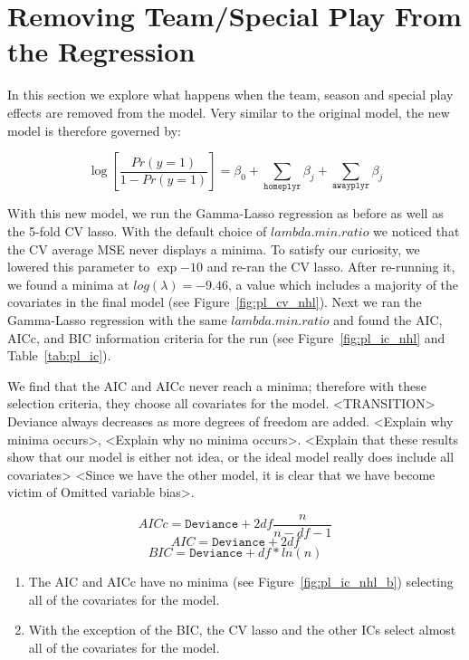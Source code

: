 \documentclass[11pt, fleqn]{article}
\begin{document}


\section{Removing Team/Special Play From the Regression}

In this section we explore what happens when the team, season and special play effects are removed from the model.  Very similar to the original model, the new model is therefore governed by:

\[ \log\left[\frac{Pr(y=1)}{1-Pr(y=1)}\right] = \beta_0 + \sum_{\texttt{homeplyr}} \beta_j + \sum_{\texttt{awayplyr}} \beta_j \]

With this new model, we run the Gamma-Lasso regression as before as well as the 5-fold CV lasso.  With the default choice of $lambda.min.ratio$ we noticed that the CV average MSE never displays a minima.  To satisfy our curiosity, we lowered this parameter to $\exp{-10}$ and re-ran the CV lasso.  After re-running it, we found a minima at $log(\lambda)=-9.46$, a value which includes a majority of the covariates in the final model (see Figure~\vref{fig:pl_cv_nhl}).  Next we ran the Gamma-Lasso regression with the same $lambda.min.ratio$ and found the AIC, AICc, and BIC information criteria for the run (see Figure~\vref{fig:pl_ic_nhl} and Table~\vref{tab:pl_ic}).

We find that the AIC and AICc never reach a minima; therefore with these selection criteria, they choose all covariates for the model. <TRANSITION> Deviance always decreases as more degrees of freedom are added.  <Explain why minima occurs>, <Explain why no minima occurs>.  <Explain that these results show that our model is either not idea, or the ideal model really does include all covariates> <Since we have the other model, it is clear that we have become victim of Omitted variable bias>.

\begin{equation}
  AICc = \texttt{Deviance} + 2df\frac{n}{n-df-1}
  \label{eq:AICc}
\end{equation}
\begin{equation}
  AIC = \texttt{Deviance} + 2df
  \label{eq:AIC}
\end{equation}
\begin{equation}
  BIC = \texttt{Deviance} + df * ln(n)
  \label{eq:BIC}
\end{equation}

\begin{enumerate}
  \item The AIC and AICc have no minima (see Figure~\vref{fig:pl_ic_nhl_b}) selecting all of the covariates for the model.
  \item With the exception of the BIC, the CV lasso and the other ICs select almost all of the covariates for the model.
\end{enumerate}
\end{document}
